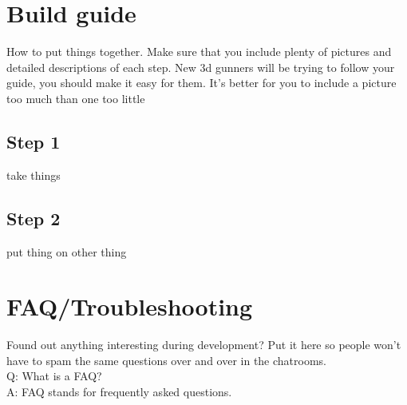 \documentclass[12pt,a4paper]{article}
\begin{document}
\newpage
\section{\textrm{Build guide}}
How to put things together. Make sure that you include plenty of pictures and detailed descriptions of each step. New 3d gunners will be trying to follow your guide, you should make it easy for them. It's better for you to include a picture too much than one too little

\subsection{\textrm{Step 1}}
take things

\subsection{\textrm{Step 2}}
put thing on other thing


\newpage
\section{\textrm{FAQ/Troubleshooting}}
Found out anything interesting during development? Put it here so people won't have to spam the same questions over and over in the chatrooms.\\
Q: What is a FAQ?\\
A: FAQ stands for frequently asked questions.\\
\end{document}
